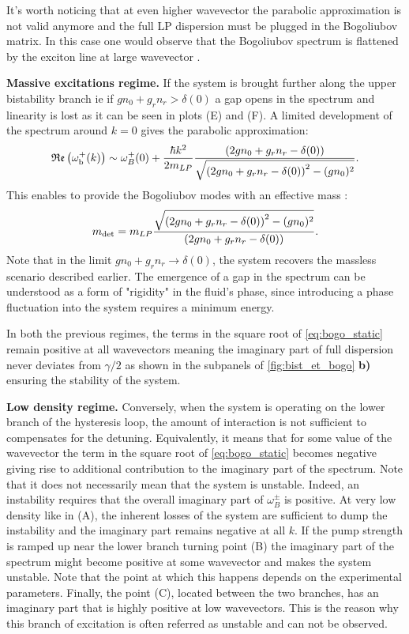 It's worth noticing that at even higher wavevector the parabolic approximation is not valid anymore and the full LP dispersion must be plugged in the Bogoliubov matrix. In this case one would observe that the Bogoliubov spectrum is flattened
by the exciton line at large wavevector \cite{I_frerot_PRX_2023}.

\bigskip

\textbf{Massive excitations regime.} If the system is brought further along the upper bistability branch ie if $gn_0+g_rn_r>\delta(0)$ a gap opens in the spectrum and linearity is lost as it can be seen 
in plots (E) and (F). A limited development of the spectrum around $k=0$ gives the parabolic approximation:
\begin{equation}
    \mathfrak{Re}\left(\omega_{\mathrm{b}}^+(k)\right) \sim \omega^+_B(0) + \dfrac{\hbar k^2}{2m_{LP}}\dfrac{\left(2g n_0 + g_r n_r - \delta(0)\right)}{\sqrt{\left(2g n_0 + g_r n_r - \delta(0)\right)^2 - (g n_0)^2}}.
\end{equation}
This enables to provide the Bogoliubov modes with an effective mass :
\begin{equation}
    m_{\mathrm{det}}= m_{LP}\dfrac{\sqrt{\left(2g n_0 + g_r n_r - \delta(0)\right)^2 - (g n_0)^2}}{\left(2g n_0 + g_r n_r - \delta(0)\right)}.
\end{equation}
Note that in the limit $gn_0+g_rn_r\to \delta(0)$, the system recovers the massless scenario described earlier. 
The emergence of a gap in the spectrum can be understood as a form of "rigidity" in the fluid's phase, since introducing a phase fluctuation into the system requires a minimum energy.

\bigskip

In both the previous regimes, the terms in the square root of \autoref{eq:bogo_static} remain positive at all wavevectors meaning the imaginary part of 
full dispersion never deviates from $\gamma/2$ as shown in the subpanels of \autoref{fig:bist_et_bogo} \textbf{b)} ensuring the stability of the system.

\bigskip

\textbf{Low density regime.} Conversely, when the system is operating on the lower branch of the hysteresis loop, the amount of interaction is not sufficient to 
compensates for the detuning. Equivalently, it means that for some value of the wavevector the term in the square root of \autoref{eq:bogo_static} becomes negative
giving rise to additional contribution to the imaginary part of the spectrum. Note that it does not necessarily mean that the system is unstable. Indeed, an instability 
requires that the overall imaginary part of $\omega^{\pm}_B$ is positive. At very low density like in (A), the inherent losses of the system 
are sufficient to dump the instability and the imaginary part remains negative at all $k$. If the pump strength is ramped up near the lower branch turning point (B) 
the imaginary part of the spectrum might become positive at some wavevector and makes the system unstable. Note that the point at which this happens depends on the experimental
parameters. Finally, the point (C), located between the two branches, has an imaginary part that is highly positive at low wavevectors. This is the reason why this branch of excitation
is often referred as unstable and can not be observed. 


